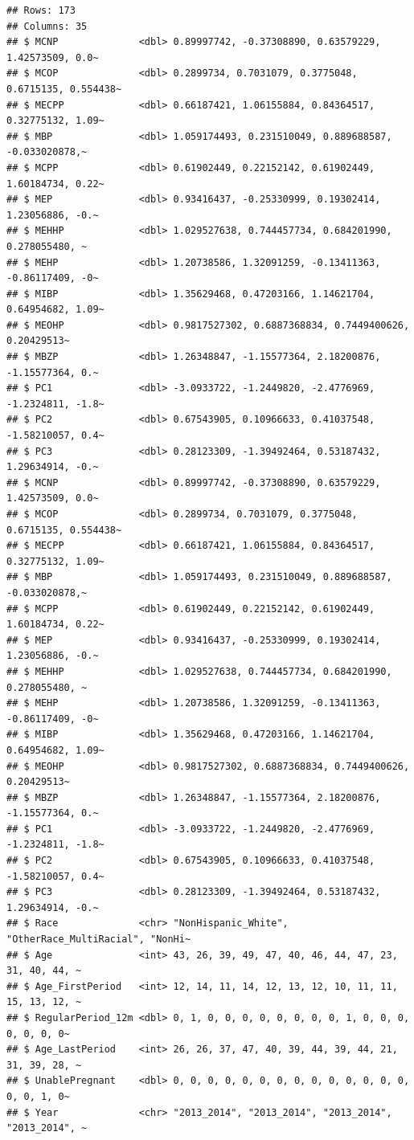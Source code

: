 \documentclass[
]{article}
\begin{document}
\begin{verbatim}
## Rows: 173
## Columns: 35
## $ MCNP              <dbl> 0.89997742, -0.37308890, 0.63579229, 1.42573509, 0.0~
## $ MCOP              <dbl> 0.2899734, 0.7031079, 0.3775048, 0.6715135, 0.554438~
## $ MECPP             <dbl> 0.66187421, 1.06155884, 0.84364517, 0.32775132, 1.09~
## $ MBP               <dbl> 1.059174493, 0.231510049, 0.889688587, -0.033020878,~
## $ MCPP              <dbl> 0.61902449, 0.22152142, 0.61902449, 1.60184734, 0.22~
## $ MEP               <dbl> 0.93416437, -0.25330999, 0.19302414, 1.23056886, -0.~
## $ MEHHP             <dbl> 1.029527638, 0.744457734, 0.684201990, 0.278055480, ~
## $ MEHP              <dbl> 1.20738586, 1.32091259, -0.13411363, -0.86117409, -0~
## $ MIBP              <dbl> 1.35629468, 0.47203166, 1.14621704, 0.64954682, 1.09~
## $ MEOHP             <dbl> 0.9817527302, 0.6887368834, 0.7449400626, 0.20429513~
## $ MBZP              <dbl> 1.26348847, -1.15577364, 2.18200876, -1.15577364, 0.~
## $ PC1               <dbl> -3.0933722, -1.2449820, -2.4776969, -1.2324811, -1.8~
## $ PC2               <dbl> 0.67543905, 0.10966633, 0.41037548, -1.58210057, 0.4~
## $ PC3               <dbl> 0.28123309, -1.39492464, 0.53187432, 1.29634914, -0.~
## $ MCNP              <dbl> 0.89997742, -0.37308890, 0.63579229, 1.42573509, 0.0~
## $ MCOP              <dbl> 0.2899734, 0.7031079, 0.3775048, 0.6715135, 0.554438~
## $ MECPP             <dbl> 0.66187421, 1.06155884, 0.84364517, 0.32775132, 1.09~
## $ MBP               <dbl> 1.059174493, 0.231510049, 0.889688587, -0.033020878,~
## $ MCPP              <dbl> 0.61902449, 0.22152142, 0.61902449, 1.60184734, 0.22~
## $ MEP               <dbl> 0.93416437, -0.25330999, 0.19302414, 1.23056886, -0.~
## $ MEHHP             <dbl> 1.029527638, 0.744457734, 0.684201990, 0.278055480, ~
## $ MEHP              <dbl> 1.20738586, 1.32091259, -0.13411363, -0.86117409, -0~
## $ MIBP              <dbl> 1.35629468, 0.47203166, 1.14621704, 0.64954682, 1.09~
## $ MEOHP             <dbl> 0.9817527302, 0.6887368834, 0.7449400626, 0.20429513~
## $ MBZP              <dbl> 1.26348847, -1.15577364, 2.18200876, -1.15577364, 0.~
## $ PC1               <dbl> -3.0933722, -1.2449820, -2.4776969, -1.2324811, -1.8~
## $ PC2               <dbl> 0.67543905, 0.10966633, 0.41037548, -1.58210057, 0.4~
## $ PC3               <dbl> 0.28123309, -1.39492464, 0.53187432, 1.29634914, -0.~
## $ Race              <chr> "NonHispanic_White", "OtherRace_MultiRacial", "NonHi~
## $ Age               <int> 43, 26, 39, 49, 47, 40, 46, 44, 47, 23, 31, 40, 44, ~
## $ Age_FirstPeriod   <int> 12, 14, 11, 14, 12, 13, 12, 10, 11, 11, 15, 13, 12, ~
## $ RegularPeriod_12m <dbl> 0, 1, 0, 0, 0, 0, 0, 0, 0, 0, 1, 0, 0, 0, 0, 0, 0, 0~
## $ Age_LastPeriod    <int> 26, 26, 37, 47, 40, 39, 44, 39, 44, 21, 31, 39, 28, ~
## $ UnablePregnant    <dbl> 0, 0, 0, 0, 0, 0, 0, 0, 0, 0, 0, 0, 0, 0, 0, 0, 1, 0~
## $ Year              <chr> "2013_2014", "2013_2014", "2013_2014", "2013_2014", ~
\end{verbatim}
\end{document}
